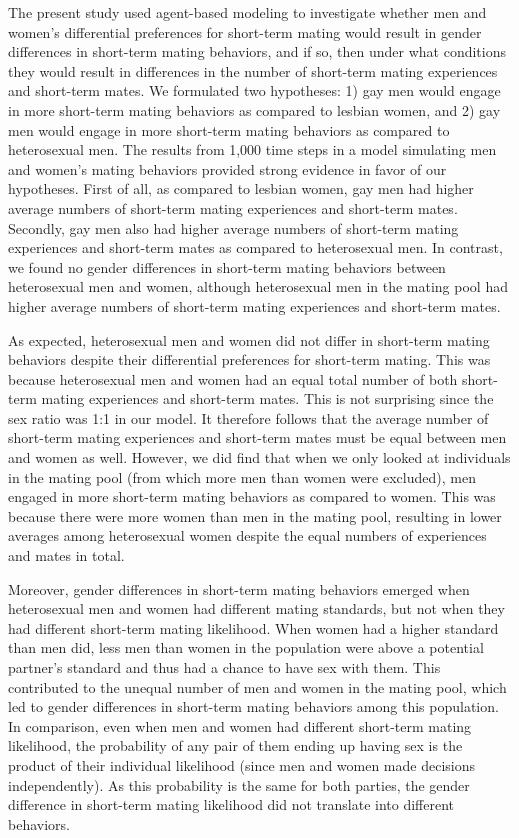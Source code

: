 \documentclass[
  11pt,
]{article}
\begin{document}
The present study used agent-based modeling to investigate whether men
and women's differential preferences for short-term mating would result
in gender differences in short-term mating behaviors, and if so, then
under what conditions they would result in differences in the number of
short-term mating experiences and short-term mates. We formulated two
hypotheses: 1) gay men would engage in more short-term mating behaviors
as compared to lesbian women, and 2) gay men would engage in more
short-term mating behaviors as compared to heterosexual men. The results
from 1,000 time steps in a model simulating men and women's mating
behaviors provided strong evidence in favor of our hypotheses. First of
all, as compared to lesbian women, gay men had higher average numbers of
short-term mating experiences and short-term mates. Secondly, gay men
also had higher average numbers of short-term mating experiences and
short-term mates as compared to heterosexual men. In contrast, we found
no gender differences in short-term mating behaviors between
heterosexual men and women, although heterosexual men in the mating pool
had higher average numbers of short-term mating experiences and
short-term mates.

As expected, heterosexual men and women did not differ in short-term
mating behaviors despite their differential preferences for short-term
mating. This was because heterosexual men and women had an equal total
number of both short-term mating experiences and short-term mates. This
is not surprising since the sex ratio was 1:1 in our model. It therefore
follows that the average number of short-term mating experiences and
short-term mates must be equal between men and women as well. However,
we did find that when we only looked at individuals in the mating pool
(from which more men than women were excluded), men engaged in more
short-term mating behaviors as compared to women. This was because there
were more women than men in the mating pool, resulting in lower averages
among heterosexual women despite the equal numbers of experiences and
mates in total.

Moreover, gender differences in short-term mating behaviors emerged when
heterosexual men and women had different mating standards, but not when
they had different short-term mating likelihood. When women had a higher
standard than men did, less men than women in the population were above
a potential partner's standard and thus had a chance to have sex with
them. This contributed to the unequal number of men and women in the
mating pool, which led to gender differences in short-term mating
behaviors among this population. In comparison, even when men and women
had different short-term mating likelihood, the probability of any pair
of them ending up having sex is the product of their individual
likelihood (since men and women made decisions independently). As this
probability is the same for both parties, the gender difference in
short-term mating likelihood did not translate into different behaviors.
\end{document}

